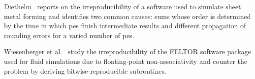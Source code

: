 Diethelm~\cite{diethelm_limits_2012} reports on the irreproducibility of a software used to simulate sheet metal forming and identifies two common causes: sums whose order is determined by the time in which \glspl{pe} finish intermediate results and different propagation of rounding errors for a varied number of \glspl{pe}.

Wiesenberger et al.~\cite{wiesenberger_reproducibility_2019} study the irreproducibility of the \textsc{FELTOR} software package used for fluid simulations due to floating-point non-associativity and counter the problem by deriving bitwise-reproducible subroutines.